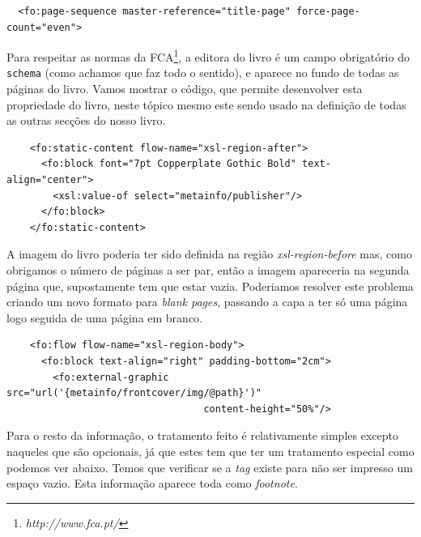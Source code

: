 \documentclass[a4paper]{article}
\begin{document}
\begin{small}
\begin{lstlisting}
  <fo:page-sequence master-reference="title-page" force-page-count="even">
\end{lstlisting}
\end{small}
  
\hspace{1cm}Para respeitar as normas da FCA\footnote{{\em http://www.fca.pt/}}, a editora do livro é um campo obrigatório do \verb|schema| (como achamos que faz todo o sentido), e aparece no fundo de todas as páginas do livro. Vamos mostrar o código, que permite desenvolver esta propriedade do livro, neste tópico mesmo este sendo usado na definição de todas as outras secções do nosso livro.\\

\begin{small}
\begin{lstlisting}
    <fo:static-content flow-name="xsl-region-after">
      <fo:block font="7pt Copperplate Gothic Bold" text-align="center">
        <xsl:value-of select="metainfo/publisher"/>
      </fo:block>
    </fo:static-content>
\end{lstlisting}
\end{small}
    
\hspace{1cm}A imagem do livro poderia ter sido definida na região {\em xsl-region-before} mas, como obrigamos o número de páginas a ser par, então a imagem apareceria na segunda página que, supostamente tem que estar vazia. Poderiamos resolver este problema criando um novo formato para {\em blank pages}, passando a capa a ter só uma página logo seguida de uma página em branco.\\

\begin{small}
\begin{lstlisting}
    <fo:flow flow-name="xsl-region-body">
      <fo:block text-align="right" padding-bottom="2cm">
        <fo:external-graphic src="url('{metainfo/frontcover/img/@path}')" 
                                  content-height="50%"/>
\end{lstlisting}
\end{small}
  
\hspace{1cm}Para o resto da informação, o tratamento feito é relativamente simples excepto naqueles que são opcionais, já que estes tem que ter um tratamento especial como podemos ver abaixo. Temos que verificar se a {\em tag} existe para não ser impresso um espaço vazio. Esta informação aparece toda como {\em footnote}.\\
\end{document}
